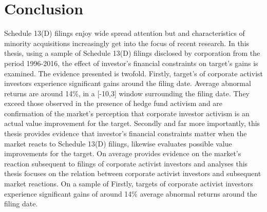 \documentclass[12pt]{article}
\begin{document}
\section{Conclusion}

Schedule 13(D) filings enjoy wide spread attention but and characteristics of minority acquisitions increasingly get into the focus of recent research.
In this thesis, using a sample of Schedule 13(D) filings disclosed by corporation from the period 1996-2016, the effect of investor's financial constraints on target's gains is examined. The evidence presented is twofold. Firstly,  target's of corporate activist investors experience significant gains around the filing date. Average abnormal returns are around 14\%, in a [-10,3] window surrounding the filing date. They exceed those observed in the presence of hedge fund activism and are confirmation of the market's perception that corporate investor activism is an actual value improvement for the target. 
Secondly and far more importantly, this thesis provides evidence that investor's financial constraints matter when the market reacts to Schedule 13(D) filings, likewise evaluates possible value improvements for the target. On average
provides evidence on the market's reaction subsequent to filings of corporate activist investors and analyses 
this thesis focuses on the relation between corporate activist investors and subsequent market reactions.
On a sample of 
Firstly, targets of corporate activist investors experience significant gains of around 14\% average abnormal returns around the filing date.  


\pagebreak
\end{document}
